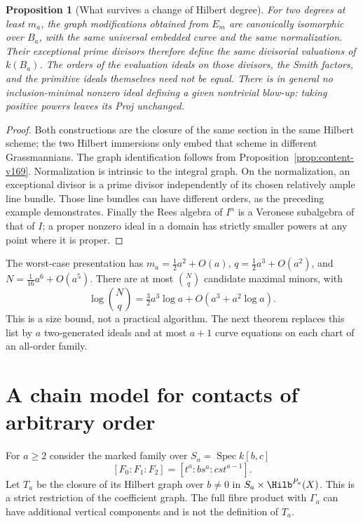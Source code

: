 \documentclass[11pt,reqno]{amsart}
\numberwithin{equation}{section}
\newtheorem{proposition}[theorem]{Proposition}
\theoremstyle{definition}\newtheorem{definition}[theorem]{Definition}
\theoremstyle{remark}\newtheorem{remark}[theorem]{Remark}
\DeclareMathOperator{\Spec}{Spec}\DeclareMathOperator{\PGL}{PGL}
\begin{document}
\begin{proposition}[What survives a change of Hilbert degree]
\label{prop:degree-change-v169}
For two degrees at least $m_a$, the graph modifications obtained from
$E_m$ are canonically isomorphic over $B_a$, with the same universal
embedded curve and the same normalization. Their exceptional prime
divisors therefore define the same divisorial valuations of $k(B_a)$.
The orders of the evaluation ideals on those divisors, the Smith
factors, and the primitive ideals themselves need not be equal.
There is in general no inclusion-minimal nonzero ideal defining a
given nontrivial blow-up: taking positive powers leaves its Proj
unchanged.
\end{proposition}
\begin{proof}
Both constructions are the closure of the same section in the same
Hilbert scheme; the two Hilbert immersions only embed that scheme in
different Grassmannians. The graph identification follows from
Proposition~\ref{prop:content-v169}. Normalization is intrinsic to the
integral graph. On the normalization, an exceptional divisor is a
prime divisor independently of its chosen relatively ample line
bundle. Those line bundles can have different orders, as the preceding
example demonstrates. Finally the Rees algebra of $I^n$ is a Veronese
subalgebra of that of $I$; a proper nonzero ideal in a domain has
strictly smaller powers at any point where it is proper.
\end{proof}

The worst-case presentation has $m_a=\tfrac12a^2+O(a)$,
$q=\tfrac12a^3+O(a^2)$, and $N=\tfrac1{16}a^6+O(a^5)$. There are at
most $\binom Nq$ candidate maximal minors, with
\[
 \log\binom Nq=\tfrac32a^3\log a+O(a^3+a^2\log a).
\]
This is a size bound, not a practical algorithm. The next theorem
replaces this list by $a$ two-generated ideals and at most $a+1$
curve equations on each chart of an all-order family.

\section{A chain model for contacts of arbitrary order}
\label{sec:chain-model-v169}
For $a\geq2$ consider the marked family over $S_a=\Spec k[b,c]$
\begin{equation}\label{eq:marked-family-v169}
 [F_0:F_1:F_2]=[t^a:b s^a:cst^{a-1}].
\end{equation}
Let $T_a$ be the closure of its Hilbert graph over $b\ne0$ in
$S_a\times\Hilb^{P_a}(X)$. This is a strict restriction of the
coefficient graph. The full fibre product with $\Gamma_a$ can have
additional vertical components and is not the definition of $T_a$.
\end{document}
